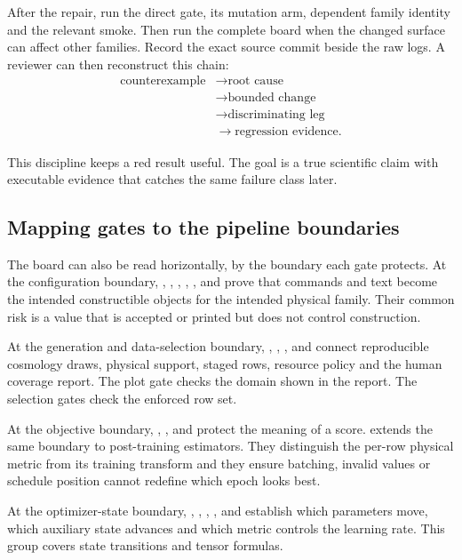 After the repair, run the direct gate, its mutation arm, dependent family
identity and the relevant smoke.  Then run the complete board when the changed
surface can affect other families.  Record the exact source commit beside the
raw logs.  A reviewer can then reconstruct this chain:
\begin{align*}
 \text{counterexample}&\rightarrow\text{root cause}\\
 &\rightarrow\text{bounded change}\\
 &\rightarrow\text{discriminating leg}\\
 &\rightarrow\text{regression evidence}.
\end{align*}

This discipline keeps a red result useful.  The goal is a true scientific
claim with executable evidence that catches the same failure class later.

\subsection{Mapping gates to the pipeline boundaries}

The board can also be read horizontally, by the boundary each gate protects.
At the configuration boundary, ,
, ,
, ,  and
 prove that commands and text become the intended
constructible objects for the intended physical family.  Their common risk is
a value that is accepted or printed but does not control construction.

At the generation and data-selection boundary, ,
, ,  and
 connect reproducible cosmology draws, physical
support, staged rows, resource policy and the human coverage report.  The
plot gate checks the domain shown in the report.  The selection gates check
the enforced row set.

At the objective boundary, ,
,  and
 protect the meaning of a score.
 extends the same boundary to post-training
estimators.  They distinguish the per-row physical metric from its training
transform and they ensure batching, invalid values or schedule position
cannot redefine which epoch looks best.

At the optimizer-state boundary, ,
, , ,
 and  establish which
parameters move, which auxiliary state advances and which metric controls
the learning rate.  This group covers state transitions and tensor formulas.

